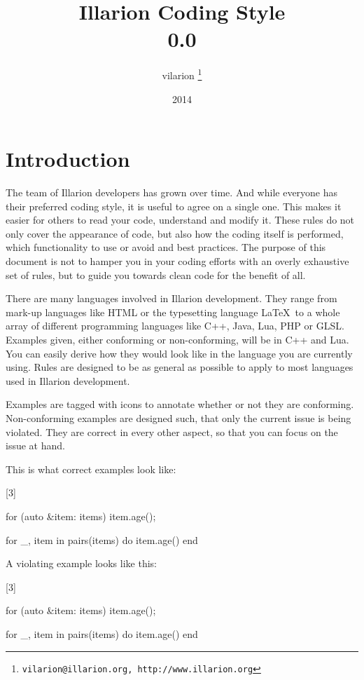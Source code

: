 \documentclass[a4paper,11pt]{scrreprt}
\newcommand{\marginMarker}[1]{%
\marginnote{%
    \hfill%
		\Huge{#1}%
}[3\baselineskip]%
}
\newcommand{\conforming}{%
\marginMarker{\textcolor{green}{\ding{51}}}%
}
\newcommand{\nonconforming}{%
\marginMarker{\textcolor{red}{\ding{55}}}%
}
\begin{document}
\title{Illarion Coding Style\\0.0}
\author{vilarion \thanks{ \texttt{vilarion@illarion.org, http://www.illarion.org}}}
\date{2014}
\maketitle
\tableofcontents

\chapter{Introduction}
The team of Illarion developers has grown over time. And while everyone has their preferred coding style, it is useful to agree on a single one. This makes it easier for others to read your code, understand and modify it. These rules do not only cover the appearance of code, but also how the coding itself is performed, which functionality to use or avoid and best practices. The purpose of this document is not to hamper you in your coding efforts with an overly exhaustive set of rules, but to guide you towards clean code for the benefit of all.

There are many languages involved in Illarion development. They range from mark-up languages like HTML or the typesetting language \LaTeX\ to a whole array of different programming languages like C++, Java, Lua, PHP or GLSL. Examples given, either conforming or non-conforming, will be in C++ and Lua. You can easily derive how they would look like in the language you are currently using. Rules are designed to be as general as possible to apply to most languages used in Illarion development.

Examples are tagged with icons to annotate whether or not they are conforming. Non-conforming examples are designed such, that only the current issue is being violated. They are correct in every other aspect, so that you can focus on the issue at hand.

This is what correct examples look like:

\conforming{}
\begin{cppBox}
for (auto &item: items) {
    item.age();
}
\end{cppBox}
\begin{luaBox}
for _, item in pairs(items) do
    item.age()
end
\end{luaBox}

A violating example looks like this:

\nonconforming{}
\begin{cppBox}
for (auto &item: items)
{
    item.age();
}
\end{cppBox}
\begin{luaBox}
for _, item in pairs(items)
do
    item.age()
end
\end{luaBox}
\end{document}
